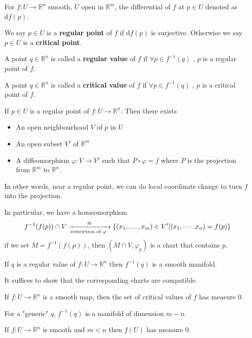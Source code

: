 For  $ f:U\rightarrow \mathbb{R}^n $ smooth,  $ U  $ open in  $ \mathbb{R}^m $,  the differential of  $ f  $ at  $ p\in U  $ denoted as  $ \mathrm{d}f(p) $.  
\begin{definition}
    We say  $ p\in U  $ is a \textbf{regular point} of  $ f  $ if  $ \mathrm{d}f(p)  $ is surjective. Otherwise we say  $ p\in U  $ is a \textbf{critical point}.
    
    A point  $ q\in \mathbb{R}^n  $ is called a \textbf{regular value} of  $ f  $ if  $ \forall  p\in f^{-1}(q)  $ ,  $ p  $ is a regular point of  $ f $.
    
    A point  $ q\in \mathbb{R}^n  $ is called a \textbf{critical value} of  $ f  $ if  $ \forall  p\in f^{-1}(q)  $ ,  $ p  $ is a critical point of  $ f $.
    
\end{definition}
\begin{theorem}
    If  $ p\in U  $ is a regular point of  $ f:U\rightarrow \mathbb{R}^n  $. Then there exists 
    \begin{itemize}
        \item An open neighbourhood  $ V  $ of  $ p  $ in  $ U  $
        \item An open subset  $ V'  $ of  $ \mathbb{R}^m $
        \item  A diffeomorphism  $ \varphi:V\rightarrow V'  $ such that  $ P\circ \varphi=f $ where  $ P  $ is the projection from  $ \mathbb{R}^m $ to  $ \mathbb{R}^n $. 
    \end{itemize}
    In other words, near a regular point, we can do local coordinate change to turn  $ f  $ into the projection.
\end{theorem}
\begin{remark}
    In particular, we have a homeomorphism
    \[ f^{-1}(f(p))\cap V \xrightarrow[\text{restriction of  $ \varphi $ }]{\cong }\{(x_1,\dots,x_m)\in V'|(x_1,\cdots.x_n)=f(p)\}\]
    \ie if we set  $ M=f^{-1}(f(p)) $, then  $ (M\cap V,\varphi_p) $ is a chart that contains  $ p  $.  
\end{remark}
\begin{corollary}
    If  $ q  $ is a regular value of  $ f:U\rightarrow \mathbb{R}^n $ then  $ f^{-1}(q) $ is a smooth manifold.
\end{corollary}
\begin{remark}
    It suffices to show that the corresponding charts are compatible.
\end{remark}
\begin{theorem}[Sard]
    If  $ f:U\rightarrow \mathbb{R}^n $ is a smooth map, then the set of critical values of  $ f $ has measure $  0 $.
\end{theorem}
\begin{remark}
    For a "generic"  $ q  $,  $ f^{-1}(q)  $ is a manifold of dimension  $ m-n $. 
\end{remark}
\begin{corollary}
    If  $ f:U\rightarrow\mathbb{R}^n $ is smooth and  $ m<n  $ then  $ f(U ) $ has measure $  0  $. 
\end{corollary}
